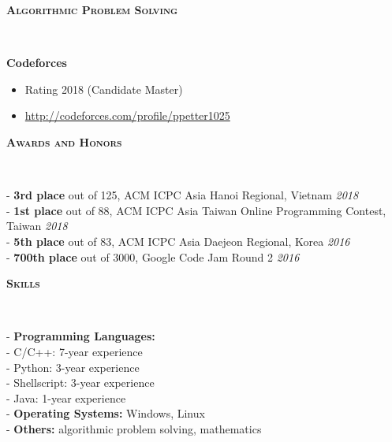 \documentclass[10pt]{article}
\newenvironment{changemargin}[2]{%
  \begin{list}{}{%
    \setlength{\topsep}{0pt}%
    \setlength{\leftmargin}{#1}%
    \setlength{\rightmargin}{#2}%
    \setlength{\listparindent}{\parindent}%
    \setlength{\itemindent}{\parindent}%
    \setlength{\parsep}{\parskip}%
  }%
  \item[]}{\end{list}
}
\newcommand{\lineover}{
	\begin{changemargin}{-0.05in}{-0.05in}
		\vspace*{-8pt}
		\hrulefill \\
		\vspace*{-2pt}
	\end{changemargin}
}
\newcommand{\header}[1]{
	\begin{changemargin}{-0.5in}{-0.5in}
		\large{\bf \scshape{#1}}\\
  	\lineover
	\end{changemargin}
}
\newenvironment{body} {
	\vspace*{-16pt}
	\begin{changemargin}{-0.25in}{-0.5in}
  }	
	{\end{changemargin}
}
\begin{document}
\header{Algorithmic Problem Solving}

\begin{body}

	\vspace{14pt}
	\textbf{Codeforces} \\
    \begin{itemize}[*]
			\item Rating 2018 (Candidate Master)
			\item \href{http://codeforces.com/profile/ppetter1025}{\url{http://codeforces.com/profile/ppetter1025}}
    \end{itemize}
	

\end{body}

\smallskip
\fi

\smallskip


\header{Awards and Honors}

\begin{body}

	\vspace{14pt}
        - \textbf{3rd place} out of 125, ACM ICPC Asia Hanoi Regional, Vietnam \hfill \emph{2018}\\
        - \textbf{1st place} out of 88, ACM ICPC Asia Taiwan Online Programming Contest, Taiwan \hfill \emph{2018}\\
        - \textbf{5th place} out of 83, ACM ICPC Asia Daejeon Regional, Korea \hfill \emph{2016}\\
        - \textbf{700th place} out of 3000, Google Code Jam Round 2 \hfill \emph{2016}\\
	\smallskip		   	
	
\end{body}

\smallskip

\header{Skills}

\begin{body}
	\vspace{14pt}
		- \textbf{Programming Languages:} \\
    		\hspace{12pt} - C/C++: 7-year experience\\
    		\hspace{12pt} - Python: 3-year experience\\
    		\hspace{12pt} - Shellscript: 3-year experience\\
    		\hspace{12pt} - Java: 1-year experience\\
		- \textbf{Operating Systems:} Windows, Linux\\
		- \textbf{Others:} algorithmic problem solving, mathematics\\
\end{body}
\end{document}
